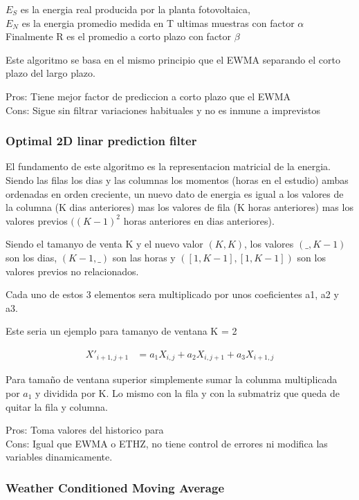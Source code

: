 $E_S$ es la energia real producida por la planta fotovoltaica,\\
$E_N$ es la energia promedio medida en T ultimas muestras con factor $\alpha$
Finalmente R es el promedio a corto plazo con factor $\beta$

Este algoritmo se basa en el mismo principio que el EWMA separando el corto plazo del largo plazo.

Pros: Tiene mejor factor de prediccion a corto plazo que el EWMA \\
Cons: Sigue sin filtrar variaciones habituales y no es inmune a imprevistos


\subsubsection{ Optimal 2D linar prediction filter} 
\label{ssub:subsubsection_name}

El fundamento de este algoritmo es la representacion matricial de la energia. Siendo las filas los dias y las columnas los momentos (horas en el estudio) ambas ordenadas en orden creciente, un nuevo dato de energia es igual a los valores de la columna (K dias anteriores) mas los valores de fila (K horas anteriores) mas los valores previos $((K-1)^2$ horas anteriores en dias anteriores).

Siendo el tamanyo de venta K y el nuevo valor $(K,K)$, los valores $(\_,K-1)$ son los dias, $(K-1,\_)$ son las horas y $([1,K-1],[1,K-1])$ son los valores previos no relacionados. 

Cada uno de estos 3 elementos sera multiplicado por unos coeficientes a1, a2 y a3. 

Este seria un ejemplo para tamanyo de ventana K = 2

\begin{align}
	X'_{i+1,j+1} &= a_1 X_{i,j} + a_2 X_{i,j+1} + a_3 X_{i+1,j}
\end{align}

Para tamaño de ventana superior simplemente sumar la colunma multiplicada por $a_1$ y dividida por K. Lo mismo con la fila y con la submatriz que queda de quitar la fila y columna.

Pros: Toma valores del historico para \\
Cons: Igual que EWMA o ETHZ, no tiene control de errores ni modifica las variables dinamicamente.


\subsubsection{ Weather Conditioned Moving Average} 
\label{ssub:subsubsection_name}

